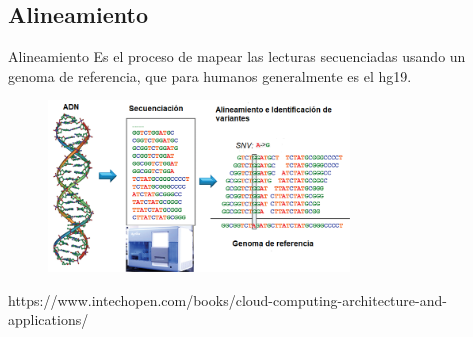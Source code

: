 \documentclass[xcolor=dvipsnames]{beamer}
\begin{document}
\subsection{Alineamiento}


\begin{frame}{Alineamiento}
	\justifying
	Es el proceso de mapear las lecturas secuenciadas usando un genoma de referencia, que para humanos generalmente es el hg19.
	\hfill \break
	
	\begin{figure}
	\centering
	\includegraphics[width=8cm]{resumenngs.png}
	\end{figure}
\justifying
\tiny{https://www.intechopen.com/books/cloud-computing-architecture-and-applications/}	
\end{frame}
\end{document}
